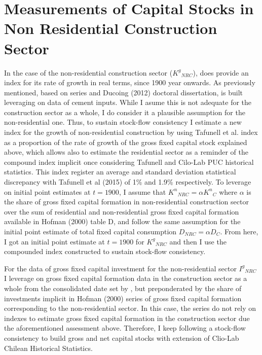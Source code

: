 %

\section{Measurements of Capital Stocks in Non Residential Construction Sector}

In the case of the non-residential construction sector (${K^{g}}_{NRC}$), \citet{Tafunell2016} does provide an index for its rate of growth in real terms, since 1900 year onwards. As previously mentioned,\citet{Tafunell2016} based on \citet{Tafunell2013} series and Ducoing (2012) doctoral dissertation, is built leveraging on data of cement inputs. While I asume this is not adequate for the construction sector as a whole, I do consider it a plausible assumption for the non-residential one. Thus, to sustain stock-flow consistency I estimate a new index for the growth of non-residential construction by using Tafunell et al. index as a proportion of the rate of growth of the gross fixed capital stock explained above, which allows also to estimate the residential sector as a reminder of the compound index implicit once considering Tafunell and Cilo-Lab PUC historical statistics. This index register an average and standard deviation statistical discrepancy with Tafunell et al (2015) of 1\% and 1.9\% respectively. To leverage on initial point estimates at $t=1900$, I assume that ${K^{n}}_{NRC}= \alpha {K^{n}}_{C}$  where $\alpha$  is the share of gross fixed capital formation in non-residential construction sector over the sum of residential and non-residential gross fixed capital formation available in Hofman (2000) table D, and follow the same assumption for the initial point estimate of total fixed capital consumption $D_{NRC} = \alpha D_{C}$.  From here, I got an initial point estimate at $t=1900$ for ${K^{g}}_{NRC}$ and then I use the compounded index constructed to sustain stock-flow consistency.

For the data of gross fixed capital investment for the non-residential sector ${I^{g}}_{NRC}$ I leverage on gross fixed capital formation data in the construction sector as a whole from the consolidated date set by \citet{PerezEyzaguirre2019}, but preponderated by the share of investments implicit in Hofman (2000) series of gross fixed capital formation corresponding to the non-residential sector. In this case, the series do not rely on \citet{Tafunell2016} indexes to estimate gross fixed capital formation in the construction sector due the aforementioned assessment above. Therefore, I keep following a stock-flow consistency to build gross and net capital stocks with \citet{PerezEyzaguirre2019} extension of Clio-Lab Chilean Historical Statistics.

